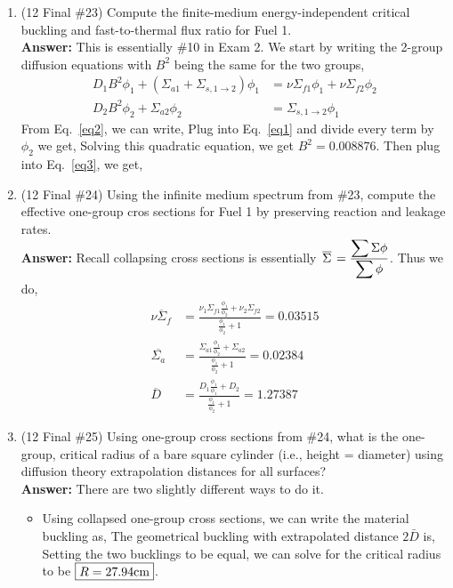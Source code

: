 \documentclass{school-22.211-notes}
\begin{document}
\begin{enumerate}
\item (12 Final \#23) Compute the finite-medium energy-independent critical buckling and fast-to-thermal flux ratio for Fuel 1. \\
\textbf{Answer:} This is essentially \#10 in Exam 2. We start by writing the 2-group diffusion equations with $B^2$ being the same for the two groups, 
\begin{align}
D_1 B^2 \phi_1 + (\Sigma_{a1} + \Sigma_{s,1\to 2}) \phi_1 &= \nu \Sigma_{f1} \phi_1 + \nu \Sigma_{f2} \phi_2  \label{eq1} \\
D_2 B^2 \phi_2 + \Sigma_{a2} \phi_2 &= \Sigma_{s,1\to 2} \phi_1  \label{eq2} 
\end{align}
From Eq.~\ref{eq2}, we can write, 
Plug into Eq.~\ref{eq1} and divide every term by $\phi_2$ we get, 
Solving this quadratic equation, we get $\boxed{B^2 = 0.008876}$. Then plug into Eq.~\ref{eq3}, we get, 

\item (12 Final \#24) Using the infinite medium spectrum from \#23, compute the effective one-group cros sections for Fuel 1 by preserving reaction and leakage rates. \\
\textbf{Answer:} Recall collapsing cross sections is essentially $\left.\overline{\Sigma} \right. = \frac{\displaystyle\sum \Sigma \phi}{\displaystyle\sum \phi}$. 
Thus we do, 
\begin{align}
\overline{\nu \Sigma_f} &= \frac{\nu_1 \Sigma_{f1} \frac{\phi_1}{\phi_2} + \nu_2 \Sigma_{f2}}{\frac{\phi_1}{\phi_2} + 1} = 0.03515  \\
\overline{\Sigma_a} &= \frac{\Sigma_{a1} \frac{\phi_1}{\phi_2} + \Sigma_{a2}}{\frac{\phi_1}{\phi_2} + 1} = 0.02384 \\
\overline{D} &= \frac{D_1 \frac{\phi_1}{\phi_1} + D_2}{\frac{\phi_1}{\phi_2} + 1} = 1.27387
\end{align}


\item (12 Final \#25) Using one-group cross sections from \#24, what is the one-group, critical radius of a bare square cylinder (i.e., height = diameter) using diffusion theory extrapolation distances for all surfaces? \\
\textbf{Answer:} There are two slightly different ways to do it. 
\begin{itemize}
\item Using collapsed one-group cross sections, we can write the material buckling as, 
The geometrical buckling with extrapolated distance $2\bar{D}$ is, 
Setting the two bucklings to be equal, we can solve for the critical radius to be $\boxed{ R = 27.94 \mathrm{cm}}$. 


\end{itemize}
\end{enumerate}
\end{document}
